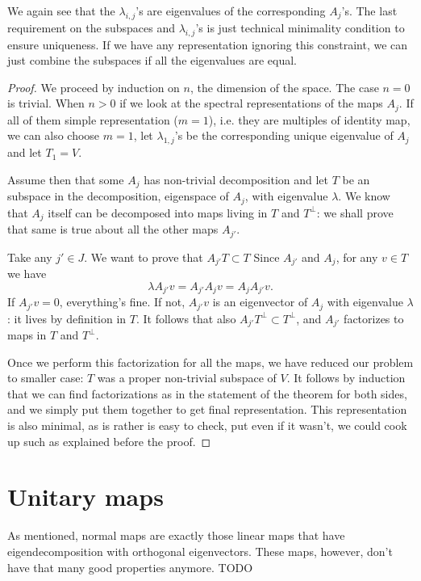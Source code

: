 We again see that the $\lambda_{i, j}$'s are eigenvalues of the corresponding $A_{j}$'s. The last requirement on the subspaces and $\lambda_{i, j}$'s is just technical minimality condition to ensure uniqueness. If we have any representation ignoring this constraint, we can just combine the subspaces if all the eigenvalues are equal.

\begin{proof}
	We proceed by induction on $n$, the dimension of the space. The case $n = 0$ is trivial. When $n > 0$ if we look at the spectral representations of the maps $A_{j}$. If all of them simple representation ($m = 1$), i.e. they are multiples of identity map, we can also choose $m = 1$, let $\lambda_{1, j}$'s be the corresponding unique eigenvalue of $A_{j}$ and let $T_{1} = V$.

	Assume then that some $A_{j}$ has non-trivial decomposition and let $T$ be an subspace in the decomposition, eigenspace of $A_{j}$, with eigenvalue $\lambda$. We know that $A_{j}$ itself can be decomposed into maps living in $T$ and $T^{\perp}$: we shall prove that same is true about all the other maps $A_{j'}$.

	Take any $j' \in J$. We want to prove that $A_{j'} T \subset T$ Since $A_{j'}$ and $A_{j}$, for any $v \in T$ we have
	\[
		\lambda A_{j'} v = A_{j'} A_{j} v = A_{j} A_{j'} v.
	\]
	If $A_{j'} v = 0$, everything's fine. If not, $A_{j'}v$ is an eigenvector of $A_{j}$ with eigenvalue $\lambda$: it lives by definition in $T$. It follows that also $A_{j'} T^{\perp} \subset T^{\perp}$, and $A_{j'}$ factorizes to maps in $T$ and $T^{\perp}$.

	Once we perform this factorization for all the maps, we have reduced our problem to smaller case: $T$ was a proper non-trivial subspace of $V$. It follows by induction that we can find factorizations as in the statement of the theorem for both sides, and we simply put them together to get final representation. This representation is also minimal, as is rather is easy to check, put even if it wasn't, we could cook up such as explained before the proof.
\end{proof}

\section{Unitary maps}

As mentioned, normal maps are exactly those linear maps that have eigendecomposition with orthogonal eigenvectors. These maps, however, don't have that many good properties anymore. TODO
















